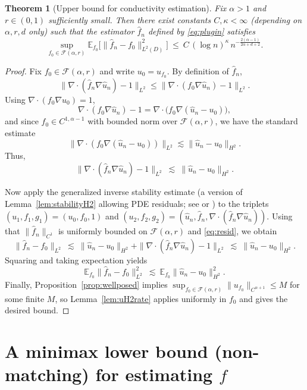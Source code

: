 \documentclass[11pt]{article}
\newtheorem{theorem}{Theorem}
\newcommand{\D}{D}
\begin{document}
\begin{theorem}[Upper bound for conductivity estimation]\label{thm:upper}
Fix $\alpha>1$ and $r\in(0,1)$ sufficiently small. Then there exist constants $C,\kappa<\infty$ (depending on $\alpha,r,d$ only) such that the estimator $\hat f_n$ defined by \eqref{eq:plugin} satisfies
\[
\sup_{f_0\in\mathcal F(\alpha,r)}
\mathbb E_{f_0}\bigl[\|\hat f_n-f_0\|_{L^2(\D)}^2\bigr]
\ \le\ C\,(\log n)^{\kappa}\,n^{-\frac{2(\alpha-1)}{2\alpha+d+2}}.
\]
\end{theorem}

\begin{proof}
Fix $f_0\in\mathcal F(\alpha,r)$ and write $u_0=u_{f_0}$. By definition of $\hat f_n$,
\[
\|\nabla\cdot(\hat f_n\nabla \hat u_n)-1\|_{L^2}
\le \|\nabla\cdot(f_0\nabla \hat u_n)-1\|_{L^2}.
\]
Using $\nabla\cdot(f_0\nabla u_0)=1$,
\[
\nabla\cdot(f_0\nabla \hat u_n)-1 = \nabla\cdot\bigl(f_0\nabla(\hat u_n-u_0)\bigr),
\]
and since $f_0\in C^{1,\alpha-1}$ with bounded norm over $\mathcal F(\alpha,r)$, we have the standard estimate
\[
\|\nabla\cdot(f_0\nabla(\hat u_n-u_0))\|_{L^2}\lesssim \|\hat u_n-u_0\|_{H^2}.
\]
Thus,
\begin{equation}\label{eq:resid}
\|\nabla\cdot(\hat f_n\nabla \hat u_n)-1\|_{L^2}\ \lesssim\ \|\hat u_n-u_0\|_{H^2}.
\end{equation}

Now apply the generalized inverse stability estimate (a version of Lemma~\ref{lem:stabilityH2} allowing PDE residuals; see \cite[Lemma 2.2]{Wang2026} or \cite[Lemma 24]{NVW2019}) to the triplets $(u_1,f_1,g_1)=(u_0,f_0,1)$ and $(u_2,f_2,g_2)=(\hat u_n,\hat f_n,\nabla\cdot(\hat f_n\nabla \hat u_n))$. Using that $\|\hat f_n\|_{C^1}$ is uniformly bounded on $\mathcal F(\alpha,r)$ and \eqref{eq:resid}, we obtain
\[
\|\hat f_n-f_0\|_{L^2}\ \lesssim\ \|\hat u_n-u_0\|_{H^2}+\|\nabla\cdot(\hat f_n\nabla \hat u_n)-1\|_{L^2}
\ \lesssim\ \|\hat u_n-u_0\|_{H^2}.
\]
Squaring and taking expectation yields
\[
\mathbb E_{f_0}\|\hat f_n-f_0\|_{L^2}^2 \ \lesssim\ \mathbb E_{f_0}\|\hat u_n-u_0\|_{H^2}^2.
\]
Finally, Proposition~\ref{prop:wellposed} implies $\sup_{f_0\in\mathcal F(\alpha,r)}\|u_{f_0}\|_{C^{\alpha+1}}\le M$ for some finite $M$, so Lemma~\ref{lem:uH2rate} applies uniformly in $f_0$ and gives the desired bound.
\end{proof}

\section{A minimax lower bound (non-matching) for estimating $f$}
\end{document}

